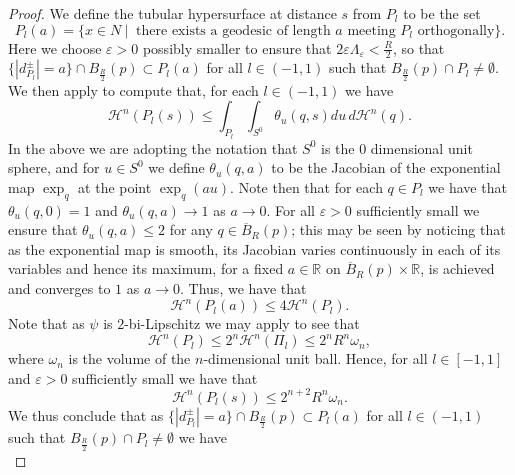\documentclass[11pt]{article}
\begin{document}
\begin{proof}
We define the tubular hypersurface at distance $s$ from $P_l$ to be the set 
\begin{equation*}
P_l(a) = \{ x \in N \: | \: \text{ there exists a geodesic of length } a \text{ meeting } P_l \text{ orthogonally} \}.
\end{equation*} 
Here we choose $\varepsilon > 0$ possibly smaller to ensure that $2\varepsilon\Lambda_\varepsilon < \frac{R}{2}$, so that $\{|d^\pm_{P_l}| = a \} \cap B_{\frac{R}{2}}(p) \subset P_l(a)$ for all $l \in (-1,1)$ such that $B_{\frac{R}{2}}(p) \cap P_l \neq \emptyset$. We then apply \cite[Lemma 3.12/8.2]{tubes} to compute that, for each $l \in (-1,1)$ we have
\begin{equation*}
    \mathcal{H}^n(P_l(s)) \leq \int_{P_l} \int_{S^0} \theta_u(q,s) du \, d\mathcal{H}^n(q).
\end{equation*}
In the above we are adopting the notation that $S^0$ is the $0$ dimensional unit sphere, and for $u \in S^0$ we define $\theta_u(q,a)$ to be the Jacobian of the exponential map $\exp_q$ at the point $\exp_q(au)$. Note then that for each $q \in P_l$ we have that $\theta_u(q,0) = 1$ and $\theta_u(q,a) \rightarrow 1$ as $a \rightarrow 0$. For all $\varepsilon > 0$ sufficiently small we ensure that $\theta_u(q,a) \leq 2$ for any $q \in \overline{B}_R(p)$; this may be seen by noticing that as the exponential map is smooth, its Jacobian varies continuously in each of its variables and hence its maximum, for a fixed $a \in \mathbb{R}$ on $\overline{B}_R(p) \times \mathbb{R}$, is achieved and converges to $1$ as $a \rightarrow 0$. Thus, we have that
\begin{equation*}
    \mathcal{H}^n(P_l(a)) \leq 4 \mathcal{H}^n(P_l).
\end{equation*}
Note that as $\psi$ is $2$-bi-Lipschitz we may apply \cite[Theorem 2.8]{E-G} to see that
\begin{equation*}
    \mathcal{H}^n(P_l) \leq 2^n \mathcal{H}^n(\Pi_l) \leq 2^n R^n \omega_n,
\end{equation*} 
where $\omega_n$ is the volume of the $n$-dimensional unit ball. Hence, for all $l \in [-1,1]$ and $\varepsilon > 0$ sufficiently small we have that 
\begin{equation*}
    \mathcal{H}^n(P_l(s)) \leq 2^{n+2}R^n\omega_n.
\end{equation*}
We thus conclude that as $\{|d^\pm_{P_l}| = a \} \cap B_{\frac{R}{2}}(p) \subset P_l(a)$ for all $l \in (-1,1)$ such that $B_{\frac{R}{2}}(p) \cap P_l \neq \emptyset$ we have
\begin{equation*}

\end{equation*}
\end{proof}
\end{document}
